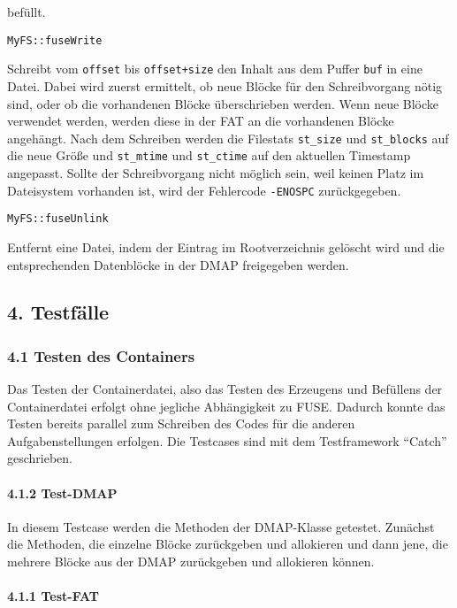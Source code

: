\documentclass[]{article}
\let\oldparagraph\paragraph
\renewcommand{\paragraph}[1]{\oldparagraph{#1}\mbox{}}
\begin{document}
befüllt.

\texttt{MyFS::fuseWrite}

Schreibt vom \texttt{offset} bis \texttt{offset+size} den Inhalt aus dem
Puffer \texttt{buf} in eine Datei. Dabei wird zuerst ermittelt, ob neue
Blöcke für den Schreibvorgang nötig sind, oder ob die vorhandenen Blöcke
überschrieben werden. Wenn neue Blöcke verwendet werden, werden diese in
der FAT an die vorhandenen Blöcke angehängt. Nach dem Schreiben werden
die Filestats \texttt{st\_size} und \texttt{st\_blocks} auf die neue
Größe und \texttt{st\_mtime} und \texttt{st\_ctime} auf den aktuellen
Timestamp angepasst. Sollte der Schreibvorgang nicht möglich sein, weil
keinen Platz im Dateisystem vorhanden ist, wird der Fehlercode
\texttt{-ENOSPC} zurückgegeben.

\texttt{MyFS::fuseUnlink}

Entfernt eine Datei, indem der Eintrag im Rootverzeichnis gelöscht wird
und die entsprechenden Datenblöcke in der DMAP freigegeben werden.

\hypertarget{testfuxe4lle}{%
\subsection{4. Testfälle}\label{testfuxe4lle}}

\hypertarget{testen-des-containers}{%
\subsubsection{4.1 Testen des Containers}\label{testen-des-containers}}

Das Testen der Containerdatei, also das Testen des Erzeugens und
Befüllens der Containerdatei erfolgt ohne jegliche Abhängigkeit zu FUSE.
Dadurch konnte das Testen bereits parallel zum Schreiben des Codes für
die anderen Aufgabenstellungen erfolgen. Die Testcases sind mit dem
Testframework ``Catch'' geschrieben.

\hypertarget{test-dmap}{%
\paragraph{4.1.2 Test-DMAP}\label{test-dmap}}

In diesem Testcase werden die Methoden der DMAP-Klasse getestet. Zunächst
die Methoden, die einzelne Blöcke zurückgeben und allokieren und dann jene,
die mehrere Blöcke aus der DMAP zurückgeben und allokieren können.

\hypertarget{test-fat}{%
\paragraph{4.1.1 Test-FAT}\label{test-fat}}
\end{document}
